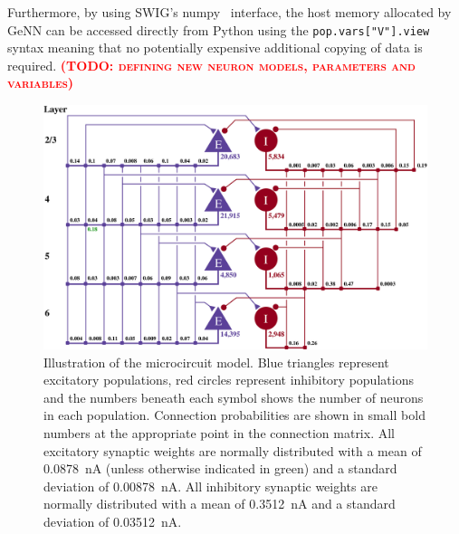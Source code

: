 \documentclass[utf8]{frontiersSCNS} %
\newcommand{\todo}[1]{\textbf{\textsc{\textcolor{red}{(TODO: #1)}}}}
\begin{document}
Furthermore, by using SWIG's numpy~\citep{VanDerWalt2011} interface, the host memory allocated by GeNN can be accessed directly from Python using the \lstinline{pop.vars["V"].view} syntax meaning that no potentially expensive additional copying of data is required.
\todo{defining new neuron models, parameters and variables}
%
\begin{figure}[t!]
    \begin{center}
        \includegraphics[width=180mm]{figures/potjans_circuit_v2}
    \end{center}
    \caption{Illustration of the microcircuit model.
    Blue triangles represent excitatory populations, red circles represent inhibitory populations and the numbers beneath each symbol shows the number of neurons in each population.
    Connection probabilities are shown in small bold numbers at the appropriate point in the connection matrix.
    All excitatory synaptic weights are normally distributed with a mean of \SI{0.0878}{\nano\ampere} (unless otherwise indicated in green) and a standard deviation of \SI{0.00878}{\nano\ampere}.
    All inhibitory synaptic weights are normally distributed with a mean of \SI{0.3512}{\nano\ampere} and a standard deviation of \SI{0.03512}{\nano\ampere}.}
    \label{fig:potjans_circuit}
\end{figure}
%
\end{document}
